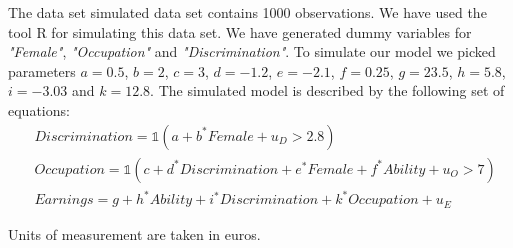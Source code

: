 \documentclass[a4paper,12pt,oneside,English]{article}
\begin{document}
The data set simulated data set contains 1000 observations. We have used the tool R for simulating this data set. We have generated dummy variables for \textit{"Female"}, \textit{"Occupation"} and \textit{"Discrimination"}. To simulate our model we picked parameters $a=0.5$, $b=2$, $c=3$, $d=-1.2$, $e=-2.1$, $f=0.25$, $g=23.5$, $h=5.8$, $i=-3.03$ and $k=12.8$. The simulated model is described by the following set of equations:
\begin{equation}
    \begin{split}
        &Discrimination=\mathds{1}(a+b^*Female+u_D>2.8)\\
        &Occupation=\mathds{1}(c+d^*Discrimination+e^*Female+f^*Ability+u_O>7)\\
        &Earnings=g+h^*Ability+i^*Discrimination+k^*Occupation+u_E
    \end{split}
\end{equation}

Units of measurement are taken in euros.
\end{document}
